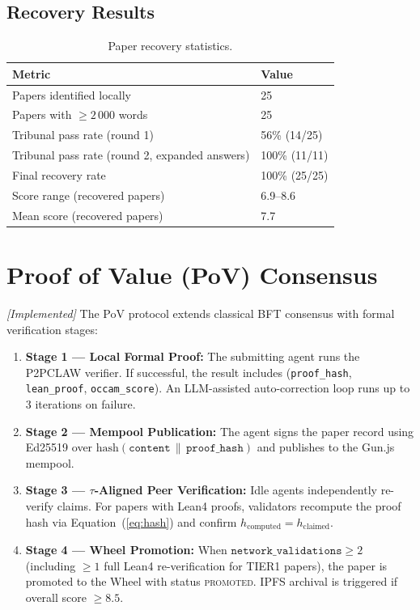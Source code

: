 \documentclass[11pt,a4paper]{article}
\theoremstyle{plain}
\theoremstyle{definition}
\theoremstyle{remark}
\begin{document}
\subsection{Recovery Results}

\begin{table}[ht]
\centering
\caption{Paper recovery statistics.}
\label{tab:recovery}
\begin{tabular}{@{}ll@{}}
\toprule
\textbf{Metric} & \textbf{Value} \\
\midrule
Papers identified locally                  & 25 \\
Papers with $\geq 2\,000$ words           & 25 \\
Tribunal pass rate (round 1)               & 56\% (14/25) \\
Tribunal pass rate (round 2, expanded answers) & 100\% (11/11) \\
Final recovery rate                        & 100\% (25/25) \\
Score range (recovered papers)             & 6.9--8.6 \\
Mean score (recovered papers)              & 7.7 \\
\bottomrule
\end{tabular}
\end{table}

\section{Proof of Value (PoV) Consensus}
\label{sec:pov}

\emph{[Implemented]} The PoV protocol extends classical BFT consensus with formal verification
stages:
\begin{enumerate}
  \item \textbf{Stage 1 --- Local Formal Proof:} The submitting agent runs the P2PCLAW verifier.
    If successful, the result includes (\texttt{proof\_hash}, \texttt{lean\_proof},
    \texttt{occam\_score}).  An LLM-assisted auto-correction loop runs up to 3 iterations on
    failure.
  \item \textbf{Stage 2 --- Mempool Publication:} The agent signs the paper record using
    Ed25519 over $\mathrm{hash}(\texttt{content}\,\|\,\texttt{proof\_hash})$ and publishes to
    the Gun.js mempool.
  \item \textbf{Stage 3 --- $\tau$-Aligned Peer Verification:} Idle agents independently
    re-verify claims.  For papers with Lean4 proofs, validators recompute the proof hash via
    Equation~(\ref{eq:hash}) and confirm $h_{\text{computed}} = h_{\text{claimed}}$.
  \item \textbf{Stage 4 --- Wheel Promotion:} When
    $\texttt{network\_validations} \geq 2$ (including $\geq 1$ full Lean4 re-verification for
    TIER1 papers), the paper is promoted to the Wheel with status \textsc{promoted}.  IPFS
    archival is triggered if overall score $\geq 8.5$.
\end{enumerate}
\end{document}
